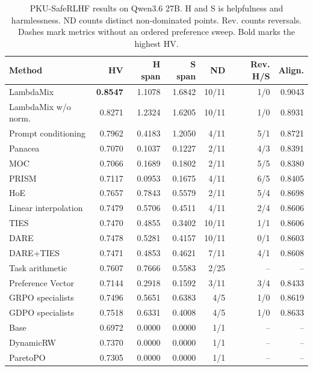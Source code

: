 \begin{table}[htbp]
\centering\small
\setlength{\tabcolsep}{3pt}
\caption{PKU-SafeRLHF results on Qwen3.6 27B. H and S is helpfulness and harmlessness. ND counts distinct non-dominated points. Rev. counts reversals. Dashes mark metrics without an ordered preference sweep. Bold marks the highest HV.}
\label{tab:full-pku-q27}
\begin{tabular}{@{}lrrrrrr@{}}
\toprule
Method & HV & H span & S span & ND & Rev. H/S & Align.\\
\midrule
LambdaMix & \textbf{0.8547} & 1.1078 & 1.6842 & 10/11 & 1/0 & 0.9043\\
LambdaMix w/o norm. & 0.8271 & 1.2324 & 1.6205 & 10/11 & 1/0 & 0.8931\\
\midrule
Prompt conditioning & 0.7962 & 0.4183 & 1.2050 & 4/11 & 5/1 & 0.8721\\
Panacea & 0.7070 & 0.1037 & 0.1227 & 2/11 & 4/3 & 0.8391\\
MOC & 0.7066 & 0.1689 & 0.1802 & 2/11 & 5/5 & 0.8380\\
PRISM & 0.7117 & 0.0953 & 0.1675 & 4/11 & 6/5 & 0.8405\\
HoE & 0.7657 & 0.7843 & 0.5579 & 2/11 & 5/4 & 0.8698\\
\midrule
Linear interpolation & 0.7479 & 0.5706 & 0.4511 & 4/11 & 2/4 & 0.8606\\
TIES & 0.7470 & 0.4855 & 0.3402 & 10/11 & 1/1 & 0.8606\\
DARE & 0.7478 & 0.5281 & 0.4157 & 10/11 & 0/1 & 0.8603\\
DARE+TIES & 0.7471 & 0.4853 & 0.4621 & 7/11 & 4/1 & 0.8608\\
Task arithmetic & 0.7607 & 0.7666 & 0.5583 & 2/25 & -- & --\\
Preference Vector & 0.7144 & 0.2918 & 0.1592 & 3/11 & 3/4 & 0.8433\\
\midrule
GRPO specialists & 0.7496 & 0.5651 & 0.6383 & 4/5 & 1/0 & 0.8619\\
GDPO specialists & 0.7518 & 0.6331 & 0.4008 & 4/5 & 1/0 & 0.8633\\
\midrule
Base & 0.6972 & 0.0000 & 0.0000 & 1/1 & -- & --\\
DynamicRW & 0.7370 & 0.0000 & 0.0000 & 1/1 & -- & --\\
ParetoPO & 0.7305 & 0.0000 & 0.0000 & 1/1 & -- & --\\
\bottomrule
\end{tabular}
\end{table}